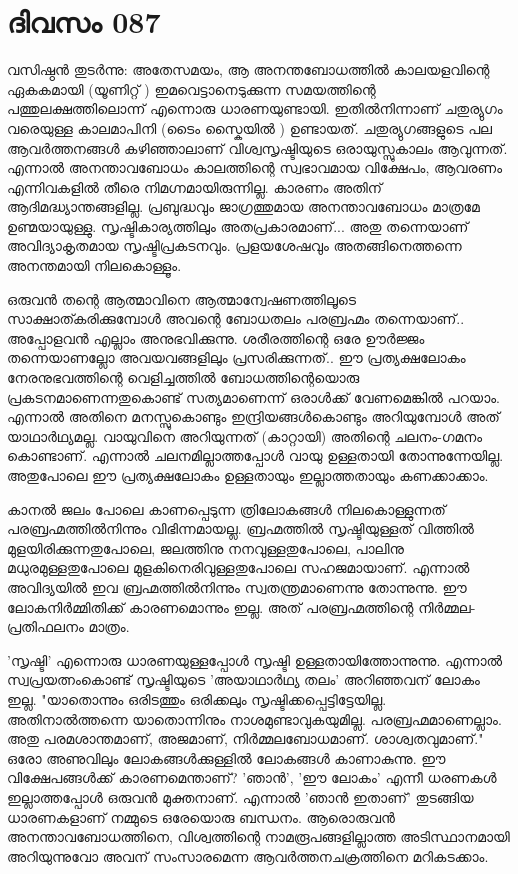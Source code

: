 \newpage
\section{ദിവസം 087}


വസിഷ്ഠന്‍ തുടര്‍ന്നു: അതേസമയം, ആ അനന്തബോധത്തില്‍ കാലയളവിന്റെ ഏകകമായി (യൂണിറ്റ്‌ )  ഇമവെട്ടാനെടുക്കുന്ന സമയത്തിന്റെ പത്തുലക്ഷത്തിലൊന്ന് എന്നൊരു ധാരണയുണ്ടായി. ഇതില്‍നിന്നാണ്‌ ചതുര്യുഗം വരെയുള്ള കാലമാപിനി (ടൈം സ്കൈയില്‍ ) ഉണ്ടായത്‌. ചതുര്യുഗങ്ങളുടെ പല ആവര്‍ത്തനങ്ങള്‍ കഴിഞ്ഞാലാണ്‌ വിശ്വസൃഷ്ടിയുടെ ഒരായുസ്സുകാലം ആവുന്നത്‌. എന്നാല്‍ അനന്താവബോധം കാലത്തിന്റെ സ്വഭാവമായ വിക്ഷേപം, ആവരണം എന്നിവകളില്‍ തീരെ നിമഗ്നമായിരുന്നില്ല. കാരണം അതിന്‌ ആദിമദ്ധ്യാന്തങ്ങളില്ല. പ്രബുദ്ധവും ജാഗ്രത്തുമായ അനന്താവബോധം മാത്രമേ ഉണ്മയായുള്ളു. സൃഷ്ടികാര്യത്തിലും അതപ്രകാരമാണ്‌... അതു തന്നെയാണ്‌ അവിദ്യാകൃതമായ സൃഷ്ടിപ്രകടനവും. പ്രളയശേഷവും അതങ്ങിനെത്തന്നെ അനന്തമായി നിലകൊള്ളൂം. 

ഒരുവന്‍ തന്റെ ആത്മാവിനെ ആത്മാന്വേഷണത്തിലൂടെ സാക്ഷാത്കരിക്കുമ്പോള്‍ അവന്റെ ബോധതലം പരബ്രഹ്മം തന്നെയാണ്‌..  അപ്പോളവന്‍ എല്ലാം അനുഭവിക്കുന്നു. ശരീരത്തിന്റെ ഒരേ ഊര്‍ജ്ജം തന്നെയാണല്ലോ അവയവങ്ങളിലും പ്രസരിക്കുന്നത്‌.. ഈ പ്രത്യക്ഷലോകം നേരനുഭവത്തിന്റെ വെളിച്ചത്തില്‍ ബോധത്തിന്റെയൊരു പ്രകടനമാണെന്നതുകൊണ്ട്‌ സത്യമാണെന്ന് ഒരാള്‍ക്ക്‌ വേണമെങ്കില്‍ പറയാം. എന്നാല്‍ അതിനെ മനസ്സുകൊണ്ടും ഇന്ദ്രിയങ്ങള്‍കൊണ്ടും അറിയുമ്പോള്‍ അത്‌ യാഥാര്‍ഥ്യമല്ല. വായുവിനെ അറിയുന്നത്‌ (കാറ്റായി) അതിന്റെ ചലനം-ഗമനം കൊണ്ടാണ്‌. എന്നാല്‍ ചലനമില്ലാത്തപ്പോള്‍ വായു ഉള്ളതായി തോന്നുന്നേയില്ല. അതുപോലെ ഈ പ്രത്യക്ഷലോകം ഉള്ളതായും ഇല്ലാത്തതായും കണക്കാക്കാം. 


കാനല്‍ ജലം പോലെ കാണപ്പെടുന്ന ത്രിലോകങ്ങള്‍ നിലകൊള്ളുന്നത്‌ പരബ്രഹ്മത്തില്‍നിന്നും വിഭിന്നമായല്ല. ബ്രഹ്മത്തില്‍ സൃഷ്ടിയുള്ളത്‌ വിത്തില്‍ മുളയിരിക്കുന്നതുപോലെ, ജലത്തിനു നനവുള്ളതുപോലെ, പാലിനു മധുരമുള്ളതുപോലെ മുളകിനെരിവുള്ളതുപോലെ സഹജമായാണ്‌. എന്നാല്‍ അവിദ്യയില്‍ ഇവ ബ്രഹ്മത്തില്‍നിന്നും സ്വതന്ത്രമാണെന്നു തോന്നുന്നു. ഈ ലോകനിര്‍മ്മിതിക്ക്‌ കാരണമൊന്നും ഇല്ല. അത്‌ പരബ്രഹ്മത്തിന്റെ നിര്‍മ്മല-പ്രതിഫലനം മാത്രം.

'സൃഷ്ടി' എന്നൊരു ധാരണയുള്ളപ്പോള്‍ സൃഷ്ടി ഉള്ളതായിത്തോന്നുന്നു. എന്നാല്‍ സ്വപ്രയത്നംകൊണ്ട്‌ സൃഷ്ടിയുടെ 'അയാഥാര്‍ഥ്യ തലം' അറിഞ്ഞവന്‌ ലോകം ഇല്ല. "യാതൊന്നും ഒരിടത്തും ഒരിക്കലും സൃഷ്ടിക്കപ്പെട്ടിട്ടേയില്ല. അതിനാല്‍ത്തന്നെ യാതൊന്നിനും നാശമുണ്ടാവുകയുമില്ല. പരബ്രഹ്മമാണെല്ലാം. അതു പരമശാന്തമാണ്‌, അജമാണ്‌, നിര്‍മ്മലബോധമാണ്‌. ശാശ്വതവുമാണ്‌." ഒരോ അണുവിലും ലോകങ്ങള്‍ക്കുള്ളില്‍ ലോകങ്ങള്‍ കാണാകുന്നു. ഈ വിക്ഷേപങ്ങള്‍ക്ക്‌ കാരണമെന്താണ്‌? 'ഞാന്‍', 'ഈ ലോകം' എന്നീ ധരണകള്‍ ഇല്ലാത്തപ്പോള്‍ ഒരുവന്‍ മുക്തനാണ്‌. എന്നാല്‍ 'ഞാന്‍ ഇതാണ്‌' തുടങ്ങിയ ധാരണകളാണ്‌ നമ്മുടെ ഒരേയൊരു ബന്ധനം. ആരൊരുവന്‍ അനന്താവബോധത്തിനെ, വിശ്വത്തിന്റെ നാമരൂപങ്ങളില്ലാത്ത അടിസ്ഥാനമായി അറിയുന്നുവോ അവന്‌ സംസാരമെന്ന ആവര്‍ത്തനചക്രത്തിനെ മറികടക്കാം.
